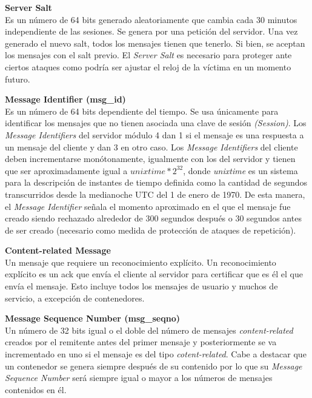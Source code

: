 \begin{description}
	\item  \textbf{Server Salt}\\
	Es un número de 64 bits generado aleatoriamente que cambia cada 30 minutos independiente de las sesiones. Se genera por una petición del servidor. Una vez generado el nuevo salt, todos los mensajes tienen que tenerlo. Si bien, se aceptan los mensajes con el salt previo. El \emph{Server Salt} es necesario para proteger ante ciertos ataques como podría ser ajustar el reloj de la víctima en un momento futuro.

	\item \textbf{Message Identifier (msg\_id)}\\
	Es un número de 64 bits dependiente del tiempo. Se usa únicamente para identificar los mensajes que no tienen asociada una clave de sesión \emph{(Session)}. Los \emph{Message Identifiers} del servidor módulo 4 dan 1 si el mensaje es una respuesta a un mensaje del cliente y dan 3 en otro caso. 
	Los \emph{Message Identifiers} del cliente deben incrementarse monótonamente, igualmente con los del servidor y tienen que ser aproximadamente igual a $unixtime*2^{32}$, donde \emph{unixtime} es un sistema para la descripción de instantes de tiempo definida como la cantidad de segundos transcurridos desde la medianoche UTC del 1 de enero de 1970. 
	De esta manera, el \emph{Message Identifier} señala el momento aproximado en el que el mensaje fue creado siendo rechazado alrededor de 300 segundos después o 30 segundos antes de ser creado (necesario como medida de protección de ataques de repetición).  

	\item \textbf{Content-related Message}\\
	Un mensaje que requiere un reconocimiento explícito. Un reconocimiento explícito es un ack que envía el cliente al servidor para certificar que es él el que envía el mensaje. Esto incluye todos los mensajes de usuario y muchos de servicio, a excepción de contenedores.

	\item \textbf{Message Sequence Number (msg\_seqno)}\\
	Un número de 32 bits igual o el doble del número de mensajes \emph{content-related} creados por el remitente antes del primer mensaje y posteriormente se va incrementado en uno si el mensaje es del tipo \emph{cotent-related}. Cabe a destacar que un  contenedor se genera siempre después de su contenido por lo que su \emph{Message Sequence Number} será siempre igual o mayor a los números de mensajes contenidos en él.


\end{description}

